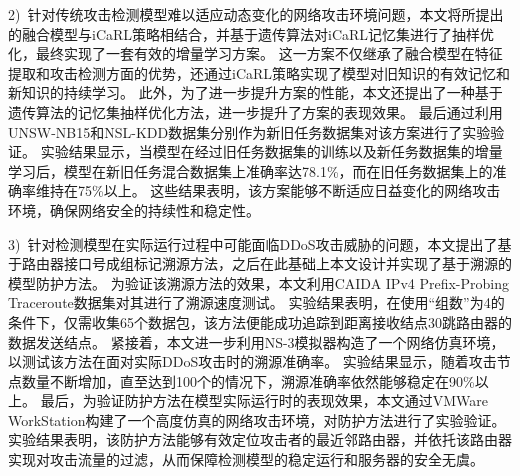 \begin{cabstract}
2)~针对传统攻击检测模型难以适应动态变化的网络攻击环境问题，本文将所提出的融合模型与iCaRL策略相结合，并基于遗传算法对iCaRL记忆集进行了抽样优化，最终实现了一套有效的增量学习方案。
这一方案不仅继承了融合模型在特征提取和攻击检测方面的优势，还通过iCaRL策略实现了模型对旧知识的有效记忆和新知识的持续学习。
此外，为了进一步提升方案的性能，本文还提出了一种基于遗传算法的记忆集抽样优化方法，进一步提升了方案的表现效果。
最后通过利用UNSW-NB15和NSL-KDD数据集分别作为新旧任务数据集对该方案进行了实验验证。
实验结果显示，当模型在经过旧任务数据集的训练以及新任务数据集的增量学习后，模型在新旧任务混合数据集上准确率达78.1\%，而在旧任务数据集上的准确率维持在75\%以上。
这些结果表明，该方案能够不断适应日益变化的网络攻击环境，确保网络安全的持续性和稳定性。\par

3)~针对检测模型在实际运行过程中可能面临DDoS攻击威胁的问题，本文提出了基于路由器接口号成组标记溯源方法，之后在此基础上本文设计并实现了基于溯源的模型防护方法。
为验证该溯源方法的效果，本文利用CAIDA IPv4 Prefix-Probing Traceroute数据集对其进行了溯源速度测试。
实验结果表明，在使用“组数”为4的条件下，仅需收集65个数据包，该方法便能成功追踪到距离接收结点30跳路由器的数据发送结点。
紧接着，本文进一步利用NS-3模拟器构造了一个网络仿真环境，以测试该方法在面对实际DDoS攻击时的溯源准确率。
实验结果显示，随着攻击节点数量不断增加，直至达到100个的情况下，溯源准确率依然能够稳定在90\%以上。
最后，为验证防护方法在模型实际运行时的表现效果，本文通过VMWare WorkStation构建了一个高度仿真的网络攻击环境，对防护方法进行了实验验证。
实验结果表明，该防护方法能够有效定位攻击者的最近邻路由器，并依托该路由器实现对攻击流量的过滤，从而保障检测模型的稳定运行和服务器的安全无虞。
\end{cabstract}



